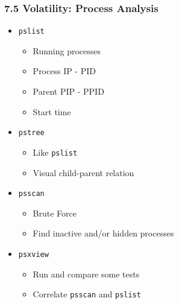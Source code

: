 \begin{frame}[fragile]
  \frametitle{7.5 Volatility: Process Analysis}
    \begin{itemize}
        \item[] \texttt{pslist}
            \begin{itemize}
                \item Running processes
                \item Process IP - PID
                \item Parent PIP - PPID
                \item Start time
            \end{itemize}
        \item[] \texttt{pstree}
            \begin{itemize}
                \item Like \texttt{pslist}
                \item Visual child-parent relation
            \end{itemize}
        \item[] \texttt{psscan}
            \begin{itemize}
                \item Brute Force
                \item Find inactive and/or hidden processes
            \end{itemize}
        \item[] \texttt{psxview}
            \begin{itemize}
                \item Run and compare some tests
                \item Correlate \texttt{psscan} and \texttt{pslist}
            \end{itemize}
    \end{itemize}
\end{frame}


